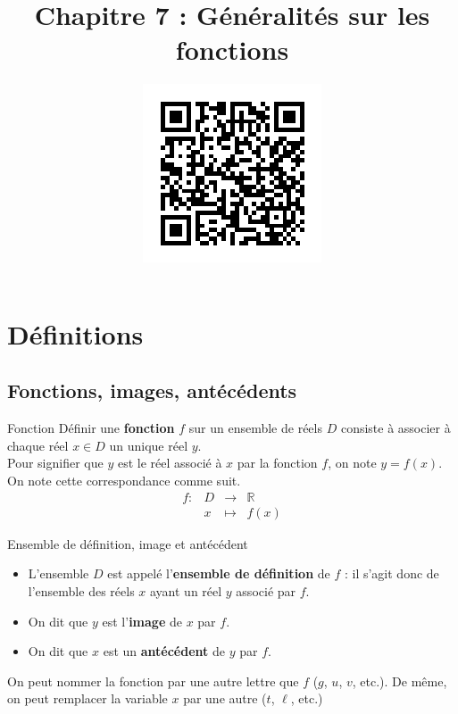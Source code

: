 \documentclass[11pt]{article}
\title{\vspace{-16mm}Chapitre 7 : Généralités sur les fonctions}
\date{\vspace{-14mm}
\href{https://erou.forge.aeif.fr/s11/fonctions.html}{
  \includegraphics[scale=.6]{qrcode.png}}
\vspace{-12mm}}
\author{}
\begin{document}
\maketitle\thispagestyle{fancy}

%

\section{Définitions}
\subsection{Fonctions, images, antécédents}
\begin{defi}{Fonction}
  Définir une \textbf{fonction} $f$ sur un ensemble de réels $D$ consiste à
  associer à chaque réel $x\in D$ un unique réel $y$.\\
  Pour signifier que $y$ est le réel associé à $x$ par la fonction $f$, on note
  $y=f(x)$. On note cette correspondance comme suit.
  \[
    \begin{array}{cccc}
      f: & D & \to & \mathbb{R} \\
   & x & \mapsto & f(x)
 \end{array}
 \]
\end{defi}
\begin{defi}{Ensemble de définition, image et antécédent}
  \begin{itemize}
    \item L'ensemble $D$ est appelé l'\textbf{ensemble de définition} de $f$ : il s'agit
      donc de l'ensemble des réels $x$ ayant un réel $y$ associé par $f$.
    \item On dit que $y$ est l'\textbf{image} de $x$ par $f$.
    \item On dit que $x$ est un \textbf{antécédent} de $y$ par $f$.
  \end{itemize}
\end{defi}
\begin{rmq}
  On peut nommer la fonction par une autre lettre que $f$ ($g$, $u$, $v$, etc.). De même, on peut
  remplacer la variable $x$ par une autre ($t$, $\ell$, etc.)
\end{rmq}
\end{document}
